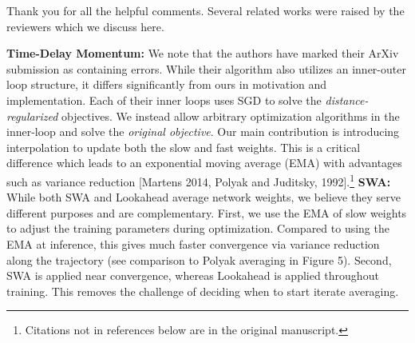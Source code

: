 \documentclass{article}
\begin{document}
Thank you for all the helpful comments. Several related works were raised by the reviewers which we discuss here.

\textbf{Time-Delay Momentum:}
We note that the authors have marked their ArXiv submission as containing errors.
While their algorithm also utilizes an inner-outer loop structure, it differs significantly from ours in motivation and implementation. Each of their inner loops uses SGD to solve the \emph{distance-regularized} objectives. We instead allow arbitrary optimization algorithms in the inner-loop and solve the \emph{original objective}. Our main contribution is introducing interpolation to update both the slow and fast weights. This is a critical difference which leads to an exponential moving average (EMA) with advantages such as variance reduction [Martens 2014, Polyak and Juditsky, 1992].\footnote{Citations not in references below are in the original manuscript.}
\textbf{SWA:} 
While both SWA and Lookahead average network weights, we believe they serve different purposes and are complementary. First, we use the EMA of slow weights to adjust the training parameters during optimization. Compared to using the EMA at inference, this gives much faster convergence via variance reduction along the trajectory (see comparison to Polyak averaging in Figure 5). 
Second, SWA is applied near convergence, whereas Lookahead is applied throughout training. This removes the challenge of deciding when to start iterate averaging. 
\end{document}
